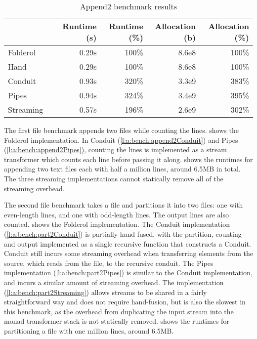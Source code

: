\begin{table}
\begin{center}
\begin{tabular}{ll|rrrr}
& & Runtime (s)  & Runtime (\%) & Allocation (b) & Allocation (\%) \\
\hline
Folderol &          & 0.29s &   100\% & 8.6e8 & 100\% \\
Hand     &          & 0.29s &   100\% & 8.6e8 & 100\% \\
Conduit &           & 0.93s &   320\% & 3.3e9 & 383\% \\
Pipes  &            & 0.94s &   324\% & 3.4e9 & 395\% \\
Streaming &         & 0.57s &   196\% & 2.6e9 & 302\% \\
\end{tabular}
\end{center}
\caption[Append2 benchmark results]{Append2 benchmark results}
\label{table:bench:append2}
\end{table}


The first file benchmark appends two files while counting the lines.
 shows the Folderol implementation.
In Conduit (\cref{l:a:bench:append2Conduit}) and Pipes (\cref{l:a:bench:append2Pipes}), counting the lines is implemented as a stream transformer which counts each line before passing it along.
 shows the runtimes for appending two text files each with half a million lines, around 6.5MB in total.
The three streaming implementations cannot statically remove all of the streaming overhead.


The second file benchmark takes a file and partitions it into two files: one with even-length lines, and one with odd-length lines.
The output lines are also counted.
 shows the Folderol implementation.
The Conduit implementation (\cref{l:a:bench:part2Conduit}) is partially hand-fused, with the partition, counting and output implemented as a single recursive function that constructs a Conduit.
Conduit still incurs some streaming overhead when transferring elements from the source, which reads from the file, to the recursive conduit.
The Pipes implementation (\cref{l:a:bench:part2Pipes}) is similar to the Conduit implementation, and incurs a similar amount of streaming overhead.
The \Streaming implementation (\cref{l:a:bench:part2Streaming}) allows streams to be shared in a fairly straightforward way and does not require hand-fusion, but is also the slowest in this benchmark, as the overhead from duplicating the input stream into the monad transformer stack is not statically removed.
 shows the runtimes for partitioning a file with one million lines, around 6.5MB.

